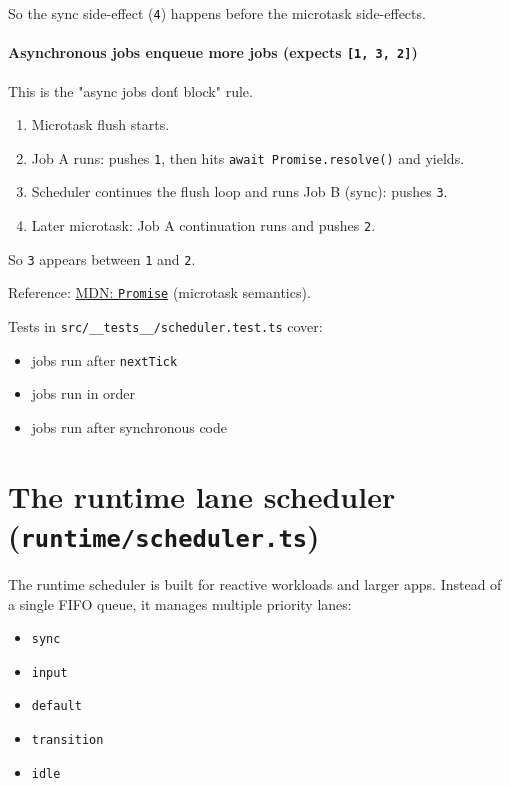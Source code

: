 So the sync side-effect (\texttt{4}) happens before the microtask side-effects.

\paragraph{Asynchronous jobs enqueue more jobs (expects \texttt{[1, 3, 2]})}

This is the "async jobs don\'t block" rule.

\begin{enumerate}
  \item Microtask flush starts.
  \item Job A runs: pushes \texttt{1}, then hits \texttt{await Promise.resolve()} and yields.
  \item Scheduler continues the flush loop and runs Job B (sync): pushes \texttt{3}.
  \item Later microtask: Job A continuation runs and pushes \texttt{2}.
\end{enumerate}

So \texttt{3} appears between \texttt{1} and \texttt{2}.

Reference: \href{https://developer.mozilla.org/en-US/docs/Web/JavaScript/Reference/Global_Objects/Promise}{MDN: \texttt{Promise}} (microtask semantics).

Tests in \texttt{src/\_\_tests\_\_/scheduler.test.ts} cover:

\begin{itemize}
  \item jobs run after \texttt{nextTick}
  \item jobs run in order
  \item jobs run after synchronous code
\end{itemize}

\section{The runtime lane scheduler (\texttt{runtime/scheduler.ts})}

The runtime scheduler is built for reactive workloads and larger apps.
Instead of a single FIFO queue, it manages multiple priority lanes:

\begin{itemize}
  \item \texttt{sync}
  \item \texttt{input}
  \item \texttt{default}
  \item \texttt{transition}
  \item \texttt{idle}
\end{itemize}

